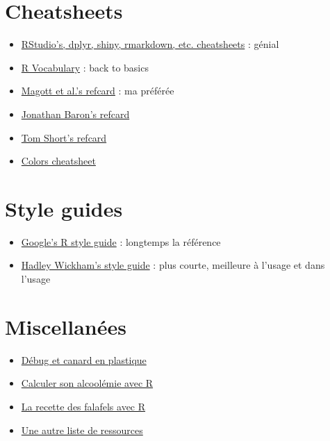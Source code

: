 \documentclass[
  letterpaper,
  DIV=11,
  numbers=noendperiod]{scrreprt}
\providecommand{\tightlist}{%
  \setlength{\itemsep}{0pt}\setlength{\parskip}{0pt}}\usepackage{longtable,booktabs,array}
\begin{document}
\hypertarget{cheatsheets}{%
\section{Cheatsheets}\label{cheatsheets}}

\begin{itemize}
\tightlist
\item
  \href{https://www.rstudio.com/resources/cheatsheets/}{RStudio's,
  dplyr, shiny, rmarkdown, etc. cheatsheets} : génial
\item
  \href{http://adv-r.had.co.nz/Vocabulary.html}{R Vocabulary} : back to
  basics
\item
  \href{https://cran.r-project.org/doc/contrib/Baggott-refcard-v2.pdf}{Magott
  et al.'s refcard} : ma préférée
\item
  \href{https://cran.r-project.org/doc/contrib/refcard.pdf}{Jonathan
  Baron's refcard}
\item
  \href{https://cran.r-project.org/doc/contrib/Short-refcard.pdf}{Tom
  Short's refcard}
\item
  \href{https://www.nceas.ucsb.edu/~frazier/RSpatialGuides/colorPaletteCheatsheet.pdf}{Colors
  cheatsheet}
\end{itemize}

\hypertarget{style-guides}{%
\section{Style guides}\label{style-guides}}

\begin{itemize}
\tightlist
\item
  \href{https://google.github.io/styleguide/Rguide.xml}{Google's R style
  guide} : longtemps la référence
\item
  \href{http://adv-r.had.co.nz/Style.html}{Hadley Wickham's style guide}
  : plus courte, meilleure à l'usage et dans l'usage
\end{itemize}

\hypertarget{miscellanuxe9es}{%
\section{Miscellanées}\label{miscellanuxe9es}}

\begin{itemize}
\tightlist
\item
  \href{https://en.wikipedia.org/wiki/Rubber_duck_debugging}{Débug et
  canard en plastique}
\item
  \href{http://www.sumsar.net/blog/2014/07/estimate-your-bac-using-drinkr/}{Calculer
  son alcoolémie avec R}
\item
  \href{http://www.butbn.cas.cz/francesco/Webpage/Gourmet.html}{La
  recette des falafels avec R}
\item
  \href{http://kh-tps.osu.edu/read.pdf}{Une autre liste de ressources}
\end{itemize}
\end{document}
